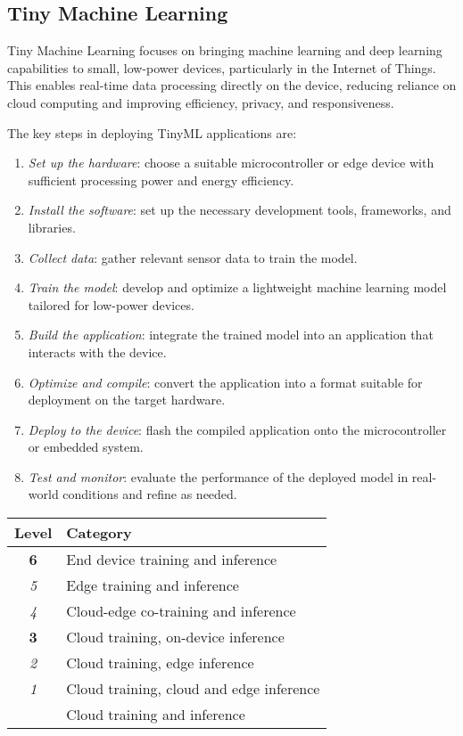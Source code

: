 \subsection{Tiny Machine Learning}
Tiny Machine Learning focuses on bringing machine learning and deep learning capabilities to small, low-power devices, particularly in the Internet of Things. 
This enables real-time data processing directly on the device, reducing reliance on cloud computing and improving efficiency, privacy, and responsiveness.  

The key steps in deploying TinyML applications are:  
\begin{enumerate}
    \item \textit{Set up the hardware}: choose a suitable microcontroller or edge device with sufficient processing power and energy efficiency.
    \item \textit{Install the software}: set up the necessary development tools, frameworks, and libraries.
    \item \textit{Collect data}: gather relevant sensor data to train the model.
    \item \textit{Train the model}: develop and optimize a lightweight machine learning model tailored for low-power devices.
    \item \textit{Build the application}: integrate the trained model into an application that interacts with the device.
    \item \textit{Optimize and compile}: convert the application into a format suitable for deployment on the target hardware.
    \item \textit{Deploy to the device}: flash the compiled application onto the microcontroller or embedded system.
    \item \textit{Test and monitor}: evaluate the performance of the deployed model in real-world conditions and refine as needed.
\end{enumerate}


\begin{table}[h]
    \centering
    \begin{tabular}{|c|l|}
        \hline
        \textbf{Level} & \textbf{Category} \\  
        \hline
        \textbf{6} & End device training and inference \\  
        \hline
        \textit{5} & Edge training and inference \\  
        \hline
        \textit{4} & Cloud-edge co-training and inference \\  
        \hline
        \textbf{3} & Cloud training, on-device inference \\  
        \hline
        \textit{2} & Cloud training, edge inference \\  
        \hline
        \textit{1} & Cloud training, cloud and edge inference \\  
        \hline
                   & Cloud training and inference \\  
        \hline
    \end{tabular}
\end{table}